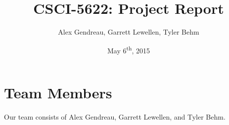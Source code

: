 \documentclass[letterpaper]{article}
\begin{document}
\title{CSCI-5622: Project Report}
\author{Alex Gendreau, Garrett Lewellen, Tyler Behm}
\date{May 6\textsuperscript{th}, 2015}

\maketitle

\section*{Team Members}

\paragraph{} Our team consists of Alex Gendreau, Garrett Lewellen, and Tyler Behm.
\end{document}
